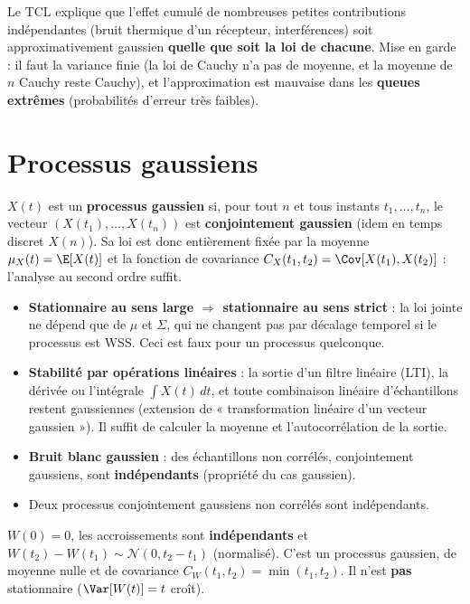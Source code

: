 \documentclass[11pt,a4paper,openany]{book}
\begin{document}
\begin{rembox}[title={Pourquoi on suppose « gaussien » en pratique}]
Le TCL explique que l'effet cumulé de nombreuses petites contributions indépendantes (bruit
thermique d'un récepteur, interférences) soit approximativement gaussien \textbf{quelle que
soit la loi de chacune}. Mise en garde : il faut la variance finie (la loi de Cauchy n'a pas de
moyenne, et la moyenne de $n$ Cauchy reste Cauchy), et l'approximation est mauvaise dans les
\textbf{queues extrêmes} (probabilités d'erreur très faibles).
\end{rembox}

\section{Processus gaussiens}

\begin{defnbox}[title={Processus gaussien}]
$X(t)$ est un \textbf{processus gaussien} si, pour tout $n$ et tous instants $t_1,\dots,t_n$, le
vecteur $(X(t_1),\dots,X(t_n))$ est \textbf{conjointement gaussien} (idem en temps discret $X(n)$).
Sa loi est donc entièrement fixée par la moyenne $\mu_X(t)=\E[X(t)]$ et la fonction de
covariance $C_X(t_1,t_2) = \Cov[X(t_1),X(t_2)]$ : l'analyse au second ordre suffit.
\end{defnbox}

\begin{propbox}[title={Propriétés}]
\begin{itemize}
\item \textbf{Stationnaire au sens large $\Rightarrow$ stationnaire au sens strict} : la loi
  jointe ne dépend que de $\mu$ et $\Sigma$, qui ne changent pas par décalage temporel si le
  processus est WSS. Ceci est faux pour un processus quelconque.
\item \textbf{Stabilité par opérations linéaires} : la sortie d'un filtre linéaire (LTI), la
  dérivée ou l'intégrale $\int X(t)\,dt$, et toute combinaison linéaire d'échantillons restent
  gaussiennes (extension de « transformation linéaire d'un vecteur gaussien »). Il suffit de
  calculer la moyenne et l'autocorrélation de la sortie.
\item \textbf{Bruit blanc gaussien} : des échantillons non corrélés, conjointement gaussiens,
  sont \textbf{indépendants} (propriété du cas gaussien).
\item Deux processus conjointement gaussiens non corrélés sont indépendants.
\end{itemize}
\end{propbox}

\begin{exbox}[title={Processus de Wiener}]
$W(0)=0$, les accroissements sont \textbf{indépendants} et $W(t_2)-W(t_1)\sim\mathcal{N}(0,t_2-t_1)$
(normalisé). C'est un processus gaussien, de moyenne nulle et de covariance $C_W(t_1,t_2) =
\min(t_1,t_2)$. Il n'est \textbf{pas} stationnaire ($\Var[W(t)] = t$ croît).
\end{exbox}

\end{document}
